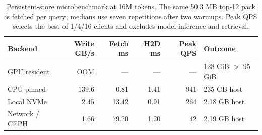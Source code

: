 \begin{table}[htbp]
\centering
\small
\setlength{\tabcolsep}{4pt}
\begin{tabular}{@{}lrrrrl@{}}
\toprule
Backend & Write GB/s & Fetch ms & H2D ms & Peak QPS & Outcome \\
\midrule
GPU resident & OOM & --- & --- & --- & 128 GiB $>$ 95 GiB \\
CPU pinned & 139.6 & 0.81 & 1.41 & 941 & 235 GB host \\
Local NVMe & 2.45 & 13.42 & 0.91 & 264 & 2.18 GB host \\
Network / CEPH & 1.66 & 79.20 & 1.20 & 42 & 2.19 GB host \\
\bottomrule
\end{tabular}
\caption{Persistent-store microbenchmark at 16M tokens. The same 50.3 MB top-12 pack is fetched per query; medians use seven repetitions after two warmups. Peak QPS selects the best of 1/4/16 clients and excludes model inference and retrieval.}
\label{tab:store-tiers}
\end{table}
